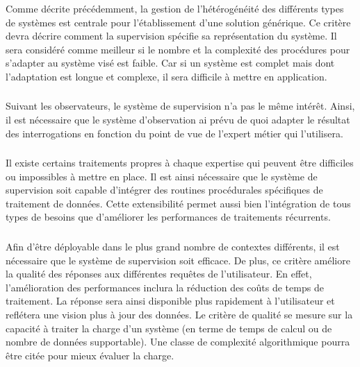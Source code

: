 \subsubsection{\critereCA}\label{sec:rw:supervision:criteres:adaptation}
Comme décrite précédemment, la gestion de l'hétérogénéité des différents types de systèmes est centrale pour l'établissement d'une solution générique. Ce critère devra décrire comment la supervision spécifie sa représentation du système. Il sera considéré comme meilleur si le nombre et la complexité des procédures pour s'adapter au système visé est faible. Car si un système est complet mais dont l'adaptation est longue et complexe, il sera difficile à mettre en application.

\subsubsection{\critereCB}
Suivant les observateurs, le système de supervision n'a pas le même intérêt. Ainsi, il est nécessaire que le système d'observation ai prévu de quoi adapter le résultat des interrogations en fonction du point de vue de l'expert métier qui l'utilisera.

\subsubsection{\critereCC}
Il existe certains traitements propres à chaque expertise qui peuvent être difficiles ou impossibles à mettre en place. Il est ainsi nécessaire que le système de supervision soit capable d'intégrer des routines procédurales spécifiques de traitement de données. Cette extensibilité permet aussi bien l'intégration de tous types de besoins que d'améliorer les performances de traitements récurrents.

\subsubsection{\critereCD}
Afin d'être déployable dans le plus grand nombre de contextes différents, il est nécessaire que le système de supervision soit efficace. De plus, ce critère améliore la qualité des réponses aux différentes requêtes de l'utilisateur. En effet, l'amélioration des performances inclura la réduction des coûts de temps de traitement. La réponse sera ainsi disponible plus rapidement à l'utilisateur et reflétera une vision plus à jour des données. Le critère de qualité se mesure sur la capacité à traiter la charge d'un système (en terme de temps de calcul ou de nombre de données supportable). Une classe de complexité algorithmique pourra être citée pour mieux évaluer la charge.
